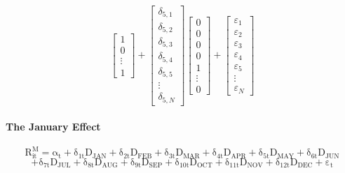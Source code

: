 \documentclass[11pt, english]{article}
\begin{document}
$${\begin{bmatrix}
                        1\\  
                        0\\  
                        \vdots\\
                        1
                \end{bmatrix}+
		\begin{bmatrix}
                        \delta_{5,1}\\
                        \delta_{5,2}\\
                        \delta_{5,3}\\
                        \delta_{5,4}\\
                        \delta_{5,5}\\
                        \vdots\\
                        \delta_{5,N}
                \end{bmatrix}
                \begin{bmatrix}
                        0\\   
                        0\\
                        0\\
                        0\\  
                        1\\  
                        \vdots\\
                        0
                \end{bmatrix}+
		\begin{bmatrix}
			\varepsilon_1\\
			\varepsilon_2\\
			\varepsilon_3\\
			\varepsilon_4\\
			\varepsilon_5\\
			\vdots\\
			\varepsilon_N
		\end{bmatrix}
		}$$

		\paragraph{The January Effect}

		$$\mathrm{R_{it}^M=\alpha_t+\delta_{1t}D_{JAN}+\delta_{2t}D_{FEB}+\delta_{3t}D_{MAR}+\delta_{4t}D_{APR}+\delta_{5t}D_{MAY}+\delta_{6t}D_{JUN}}$$ $$\mathrm{+\delta_{7t}D_{JUL}+\delta_{8t}D_{AUG}+\delta_{9t}D_{SEP}+\delta_{10t}D_{OCT}+\delta_{11t}D_{NOV}+\delta_{12t}D_{DEC}+\varepsilon_t}$$
\end{document}
